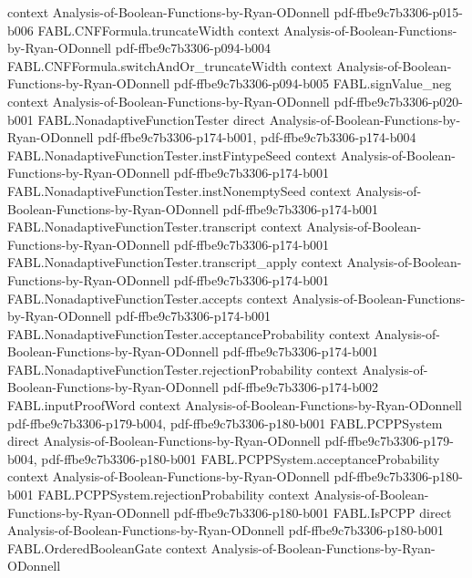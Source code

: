 \begin{theorem}
  {context}
  {Analysis-of-Boolean-Functions-by-Ryan-ODonnell}
  {pdf-ffbe9c7b3306-p015-b006}
\proofstep
  {FABL.CNFFormula.truncateWidth}
  {context}
  {Analysis-of-Boolean-Functions-by-Ryan-ODonnell}
  {pdf-ffbe9c7b3306-p094-b004}
\proofstep
  {FABL.CNFFormula.switchAndOr_truncateWidth}
  {context}
  {Analysis-of-Boolean-Functions-by-Ryan-ODonnell}
  {pdf-ffbe9c7b3306-p094-b005}
\proofstep
  {FABL.signValue_neg}
  {context}
  {Analysis-of-Boolean-Functions-by-Ryan-ODonnell}
  {pdf-ffbe9c7b3306-p020-b001}
\proofstep
  {FABL.NonadaptiveFunctionTester}
  {direct}
  {Analysis-of-Boolean-Functions-by-Ryan-ODonnell}
  {pdf-ffbe9c7b3306-p174-b001,
    pdf-ffbe9c7b3306-p174-b004}
\proofstep
  {FABL.NonadaptiveFunctionTester.instFintypeSeed}
  {context}
  {Analysis-of-Boolean-Functions-by-Ryan-ODonnell}
  {pdf-ffbe9c7b3306-p174-b001}
\proofstep
  {FABL.NonadaptiveFunctionTester.instNonemptySeed}
  {context}
  {Analysis-of-Boolean-Functions-by-Ryan-ODonnell}
  {pdf-ffbe9c7b3306-p174-b001}
\proofstep
  {FABL.NonadaptiveFunctionTester.transcript}
  {context}
  {Analysis-of-Boolean-Functions-by-Ryan-ODonnell}
  {pdf-ffbe9c7b3306-p174-b001}
\proofstep
  {FABL.NonadaptiveFunctionTester.transcript_apply}
  {context}
  {Analysis-of-Boolean-Functions-by-Ryan-ODonnell}
  {pdf-ffbe9c7b3306-p174-b001}
\proofstep
  {FABL.NonadaptiveFunctionTester.accepts}
  {context}
  {Analysis-of-Boolean-Functions-by-Ryan-ODonnell}
  {pdf-ffbe9c7b3306-p174-b001}
\proofstep
  {FABL.NonadaptiveFunctionTester.acceptanceProbability}
  {context}
  {Analysis-of-Boolean-Functions-by-Ryan-ODonnell}
  {pdf-ffbe9c7b3306-p174-b001}
\proofstep
  {FABL.NonadaptiveFunctionTester.rejectionProbability}
  {context}
  {Analysis-of-Boolean-Functions-by-Ryan-ODonnell}
  {pdf-ffbe9c7b3306-p174-b002}
\proofstep
  {FABL.inputProofWord}
  {context}
  {Analysis-of-Boolean-Functions-by-Ryan-ODonnell}
  {pdf-ffbe9c7b3306-p179-b004,
    pdf-ffbe9c7b3306-p180-b001}
\proofstep
  {FABL.PCPPSystem}
  {direct}
  {Analysis-of-Boolean-Functions-by-Ryan-ODonnell}
  {pdf-ffbe9c7b3306-p179-b004,
    pdf-ffbe9c7b3306-p180-b001}
\proofstep
  {FABL.PCPPSystem.acceptanceProbability}
  {context}
  {Analysis-of-Boolean-Functions-by-Ryan-ODonnell}
  {pdf-ffbe9c7b3306-p180-b001}
\proofstep
  {FABL.PCPPSystem.rejectionProbability}
  {context}
  {Analysis-of-Boolean-Functions-by-Ryan-ODonnell}
  {pdf-ffbe9c7b3306-p180-b001}
\proofstep
  {FABL.IsPCPP}
  {direct}
  {Analysis-of-Boolean-Functions-by-Ryan-ODonnell}
  {pdf-ffbe9c7b3306-p180-b001}
\proofstep
  {FABL.OrderedBooleanGate}
  {context}
  {Analysis-of-Boolean-Functions-by-Ryan-ODonnell}

\end{theorem}
